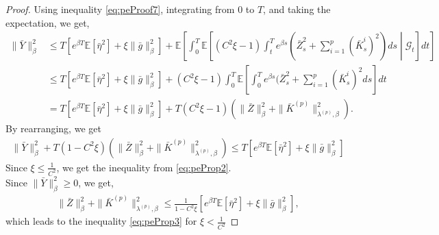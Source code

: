 \documentclass[10pt,a4paper]{amsart}
\begin{document}
\begin{proof}
    Using inequality \eqref{eq:peProof7}, integrating from $0$ to $T$, and taking the expectation, we get,
    \begin{align*}
        \|\bar{Y}\|_\beta^2&\le T\left[e^{\beta T}\mathbb{E}[\bar{\eta}^2]+\xi\|\bar{g}\|_\beta^2\right] + \mathbb{E}\left[\int_0^T\mathbb{E}\left[(C^2\xi - 1)\int_t^Te^{\beta s}(\bar{Z}_s^2+\sum_{i=1}^p(\bar{K}_s^i)^2)ds\middle|\mathcal{G}_t\right]dt\right]\\
        &\le T\left[e^{\beta T}\mathbb{E}[\bar{\eta}^2]+\xi\|\bar{g}\|_\beta^2\right] + (C^2\xi-1)\int_0^T\mathbb{E}\left[\int_0^Te^{\beta s}(\bar{Z}_s^2+\sum_{i=1}^p(\bar{K}_s^i)^2ds\right]dt\\
        &=T\left[e^{\beta T}\mathbb{E}[\bar{\eta}^2]+\xi\|\bar{g}\|_\beta^2\right] + T(C^2\xi - 1)(\|\bar{Z}\|_\beta^2+\|\bar{K}^{(p)}\|_{\lambda^{(p)},\beta}^2).
    \end{align*}
    By rearranging, we get
    \begin{align*}
        \|\bar{Y}\|_\beta^2 + T(1 - C^2\xi)(\|\bar{Z}\|_\beta^2+\|\bar{K}^{(p)}\|_{\lambda^{(p)},\beta}^2) \le T\left[e^{\beta T}\mathbb{E}[\bar{\eta}^2]+\xi\|\bar{g}\|_\beta^2\right] 
    \end{align*}
    Since $\xi\le\frac{1}{C^2}$,  we get  the inequality from \eqref{eq:peProp2}.\\
   Since $\|\bar{Y}\|_\beta^2\ge0$, we get,
    \begin{align*}
        \|\bar{Z}\|_\beta^2+\|\bar{K}^{(p)}\|_{\lambda^{(p)},\beta}^2 \le \frac{1}{1 - C^2\xi}\left[e^{\beta T}\mathbb{E}[\bar{\eta}^2]+\xi\|\bar{g}\|_\beta^2\right],
    \end{align*}
    which leads to the inequality \eqref{eq:peProp3} for $\xi<\frac{1}{C^2}$
    
\end{proof}
\end{document}

